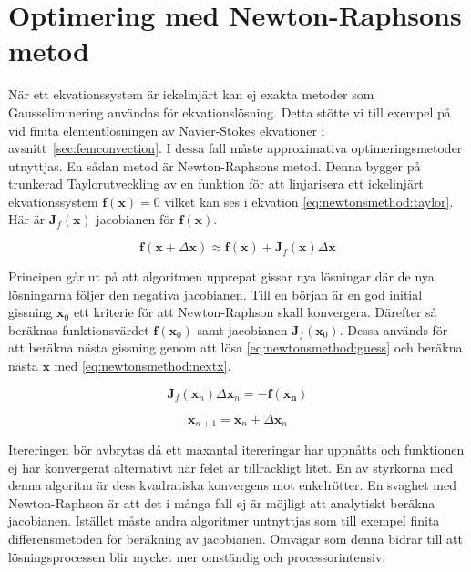 \section{Optimering med Newton-Raphsons metod}

När ett ekvationssystem är ickelinjärt kan ej exakta metoder som Gausseliminering användas
för ekvationslösning. Detta stötte vi till exempel på vid finita elementlösningen
av Navier-Stokes ekvationer i avsnitt~\ref{sec:femconvection}.
I dessa fall måste approximativa optimeringsmetoder utnyttjas. En sådan
metod är Newton-Raphsons metod. Denna bygger på trunkerad Taylorutveckling 
av en funktion för att linjarisera ett ickelinjärt ekvationssystem
$\mathbf{f}(\mathbf{x}) = 0$
vilket kan ses i ekvation \eqref{eq:newtonsmethod:taylor}. Här är
$\mathbf{J}_f(\mathbf{x})$ jacobianen för $\mathbf{f}(\mathbf{x})$. 

\begin{equation}
\label{eq:newtonsmethod:taylor}
\mathbf{f}(\mathbf{x} + \Delta\mathbf{x}) \approx \mathbf{f}(\mathbf{x}) +
\mathbf{J}_f(\mathbf{x})\Delta\mathbf{x}
\end{equation}

\noindent
Principen går ut på att algoritmen upprepat gissar nya lösningar där de
nya lösningarna följer den negativa jacobianen. Till en början är en god initial gissning
$\mathbf{x}_0$ ett kriterie för att Newton-Raphson skall konvergera. Därefter så beräknas
funktionsvärdet $\mathbf{f}(\mathbf{x}_0)$ samt jacobianen $\mathbf{J}_f(\mathbf{x}_0)$.
Dessa används för att beräkna nästa gissning genom att lösa
\eqref{eq:newtonsmethod:guess} och beräkna nästa $\mathbf{x}$ med
\eqref{eq:newtonsmethod:nextx}. \cite{heath2002}

\begin{equation}
\label{eq:newtonsmethod:guess}
\mathbf{J}_f(\mathbf{x}_n)\Delta\mathbf{x}_n = -\mathbf{f}(\mathbf{x_n})
\end{equation}

\begin{equation}
\label{eq:newtonsmethod:nextx}
\mathbf{x}_{n+1} = \mathbf{x}_n + \Delta\mathbf{x}_n
\end{equation}

\noindent
Itereringen bör avbrytas då ett maxantal itereringar har uppnåtts och funktionen
ej har konvergerat alternativt när felet är tillräckligt litet. En av styrkorna 
med denna algoritm är dess kvadratiska konvergens mot enkelrötter. \cite{ympa95}
En svaghet med Newton-Raphson är att det i många fall ej är möjligt att analytiskt beräkna
jacobianen. Istället måste andra algoritmer untnyttjas som till exempel finita differensmetoden
för beräkning av jacobianen. Omvägar som denna bidrar till att lösningsprocessen blir mycket
mer omständig och processorintensiv. 

